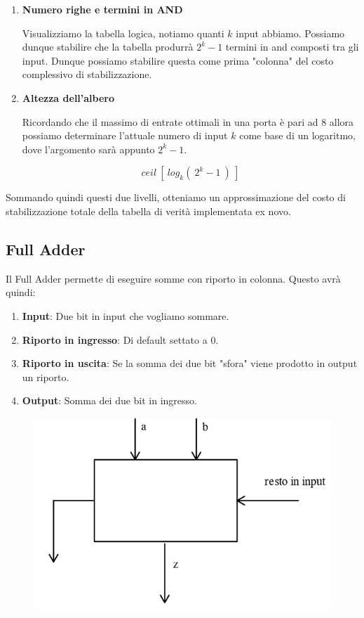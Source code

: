 \documentclass{article}
\begin{document}
\begin{enumerate}
    \item \textbf{Numero righe e termini in AND}
    
    Visualizziamo la tabella logica, notiamo quanti $k$ input abbiamo. Possiamo dunque stabilire che la tabella produrrà $2^{k}-1$ termini in and composti tra gli input. Dunque possiamo stabilire questa come prima "colonna" del costo complessivo di stabilizzazione.

    \item \textbf{Altezza dell'albero}

    Ricordando che il massimo di entrate ottimali in una porta è pari ad $8$ allora possiamo determinare l'attuale numero di input $k$ come base di un logaritmo, dove l'argomento sarà appunto $2^{k}-1$.

    \[ ceil \: [ \: log_{k} ( \:2^{k}-1 \: )\:]  \]
\end{enumerate}

Sommando quindi questi due livelli, otteniamo un approssimazione del costo di stabilizzazione totale della tabella di verità implementata ex novo.

\subsection{Full Adder}

Il Full Adder permette di eseguire somme con riporto in colonna. Questo avrà quindi:
\begin{enumerate}
    \item \textbf{Input}: Due bit in input che vogliamo sommare.
    \item \textbf{Riporto in ingresso}: Di default settato a $0$.
    \item \textbf{Riporto in uscita}: Se la somma dei due bit "sfora" viene prodotto in output un riporto.
    \item \textbf{Output}: Somma dei due bit in ingresso.
\end{enumerate}

\begin{figure}[htbp]
        \center
        \includegraphics[scale=0.55]{img/fullAdder.png}
    \end{figure}
\end{document}
